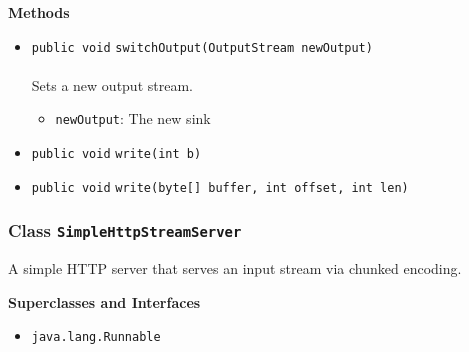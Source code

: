 \textbf{\sffamily Methods}
\begin{itemize}
\item \lstinline|public void| \lstinline|switchOutput|\lstinline|(OutputStream newOutput)|\\ \\[-0.6em]
Sets a new output stream.
\begin{itemize}
\item \lstinline|newOutput|: The new sink
\end{itemize}



\item \lstinline|public void| \lstinline|write|\lstinline|(int b)| \\[-0.6em]




\item \lstinline|public void| \lstinline|write|\lstinline|(byte[] buffer, int offset, int len)| \\[-0.6em]




\end{itemize}

\subsubsection{Class \lstinline|SimpleHttpStreamServer|}
A simple HTTP server that serves an input stream via chunked encoding. \\
\noindent\begin{minipage}[t]{5cm}
\vspace{0.3em}
\hspace*{2em}
\vspace{0.3em}
\end{minipage}



\textbf{\sffamily Superclasses and Interfaces}
\begin{itemize}
\item \lstinline|java.lang.Runnable|
\end{itemize}


